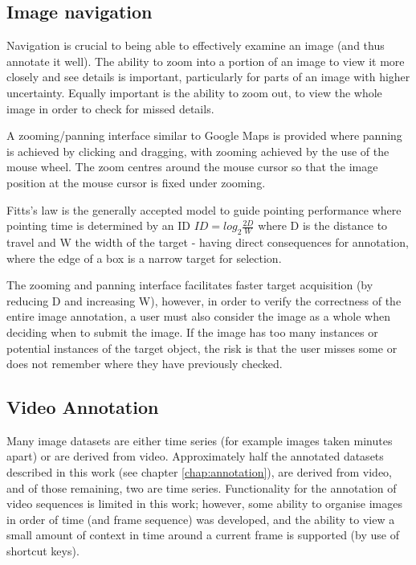 \subsection {Image navigation}

Navigation is crucial to being able to effectively examine an image (and thus annotate it well). The ability to zoom into a portion of an image to view it more closely and see details is important, particularly for parts of an image with higher uncertainty. Equally important is the ability to zoom out, to view the whole image in order to check for missed details. 

A zooming/panning interface similar to Google Maps is provided where panning is achieved by clicking and dragging, with zooming achieved by the use of the mouse wheel. The zoom centres around the mouse cursor so that the image position at the mouse cursor is fixed under zooming.

Fitts's law is the generally accepted model to guide pointing performance where pointing time is determined by an \gls{ID} $ ID = log_2 \frac{2D}{W} $ where D is the distance to travel and W the width of the target - having direct consequences for annotation, where the edge of a box is a narrow target for selection. 

The zooming and panning interface facilitates faster target acquisition (by reducing D and increasing W), however, in order to verify the correctness of the entire image annotation, a user must also consider the image as a whole when deciding when to submit the image. If the image has too many instances or potential instances of the target object, the risk is that the user misses some or does not remember where they have previously checked. 


\subsection {Video Annotation}

Many image datasets are either time series (for example images taken minutes apart) or are derived from video.  Approximately half the annotated datasets described in this work (see chapter \ref{chap:annotation}),  are derived from video, and of those remaining, two are time series. Functionality for the annotation of video sequences is limited in this work; however, some ability to organise images in order of time (and frame sequence) was developed, and the ability to view a small amount of context in time around a current frame is supported (by use of shortcut keys).

